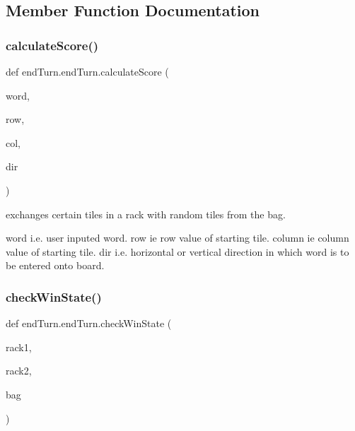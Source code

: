 \subsection{Member Function Documentation}
\mbox{\label{classend_turn_1_1end_turn_a1cfa4c1d439636ea82d00f31c1bb2f1f}} 
\subsubsection{\texorpdfstring{calculate\+Score()}{calculateScore()}}
{\footnotesize\ttfamily def end\+Turn.\+end\+Turn.\+calculate\+Score (\begin{DoxyParamCaption}\item[{}]{word,  }\item[{}]{row,  }\item[{}]{col,  }\item[{}]{dir }\end{DoxyParamCaption})}



exchanges certain tiles in a rack with random tiles from the bag. 

word i.\+e. user inputed word.  row ie row value of starting tile.  column ie column value of starting tile.  dir i.\+e. horizontal or vertical direction in which word is to be entered onto board. \mbox{\label{classend_turn_1_1end_turn_a6390e7407b5d8a8744603ce54ce553b7}} 
\subsubsection{\texorpdfstring{check\+Win\+State()}{checkWinState()}}
{\footnotesize\ttfamily def end\+Turn.\+end\+Turn.\+check\+Win\+State (\begin{DoxyParamCaption}\item[{}]{rack1,  }\item[{}]{rack2,  }\item[{}]{bag }\end{DoxyParamCaption})}



